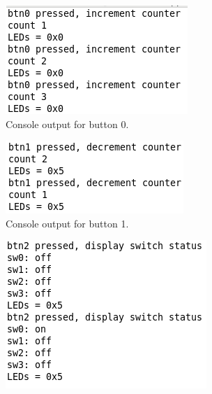 \documentclass[11pt,letterpaper,titlepage]{article}
\begin{document}
\begin{figure}[ht]
\centering
    \begin{subfigure}[]{0.45\textwidth}
        \includegraphics[width=\linewidth]{Btn0.png} 
        \caption{Console output for button 0.}
    \end{subfigure}
    \begin{subfigure}[]{0.45\textwidth}
        \includegraphics[width=\linewidth]{Btn1.png}
        \caption{Console output for button 1.}
    \end{subfigure}
    \begin{subfigure}[]{0.45\textwidth}
        \includegraphics[width=\linewidth]{Btn2.png} 

\end{subfigure}
\end{figure}
\end{document}
